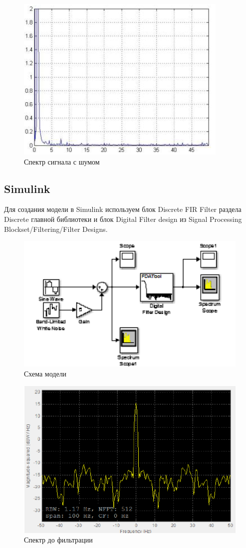 \begin{figure}[H]
   \includegraphics[scale=0.7]{lab6/4.png}
   \caption{Спектр сигнала с шумом}
\end{figure}

\subsection{Simulink}
Для создания модели в Simulink
используем блок Discrete FIR Filter раздела Discrete главной библиотеки и
блок Digital Filter design из Signal Processing Blockset/Filtering/Filter Designs.

\begin{figure}[H]
   \includegraphics[scale=0.7]{lab6/5.png}
   \caption{Схема модели}
\end{figure}

\begin{figure}[H]
   \includegraphics[scale=0.7]{lab6/6.png}
   \caption{Спектр до фильтрации}
\end{figure}

